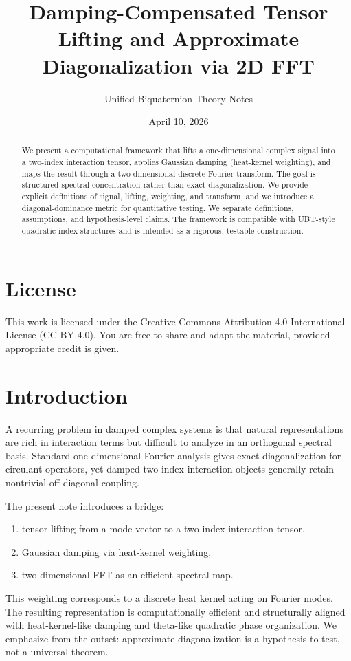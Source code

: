 \documentclass[11pt]{article}
\title{Damping-Compensated Tensor Lifting and Approximate Diagonalization via 2D FFT}
\author{Unified Biquaternion Theory Notes}
\date{April 10, 2026}
\begin{document}
\maketitle

\begin{abstract}
We present a computational framework that lifts a one-dimensional complex signal into a two-index interaction tensor, applies Gaussian damping (heat-kernel weighting), and maps the result through a two-dimensional discrete Fourier transform. The goal is structured spectral concentration rather than exact diagonalization. We provide explicit definitions of signal, lifting, weighting, and transform, and we introduce a diagonal-dominance metric for quantitative testing. We separate definitions, assumptions, and hypothesis-level claims. The framework is compatible with UBT-style quadratic-index structures and is intended as a rigorous, testable construction.
\end{abstract}

\section*{License}
This work is licensed under the Creative Commons Attribution 4.0 International License (CC BY 4.0).
You are free to share and adapt the material, provided appropriate credit is given.

\section{Introduction}
A recurring problem in damped complex systems is that natural representations are rich in interaction terms but difficult to analyze in an orthogonal spectral basis. Standard one-dimensional Fourier analysis gives exact diagonalization for circulant operators, yet damped two-index interaction objects generally retain nontrivial off-diagonal coupling.

The present note introduces a bridge:
\begin{enumerate}
    \item tensor lifting from a mode vector to a two-index interaction tensor,
    \item Gaussian damping via heat-kernel weighting,
    \item two-dimensional FFT as an efficient spectral map.
\end{enumerate}
This weighting corresponds to a discrete heat kernel acting on Fourier modes.
The resulting representation is computationally efficient and structurally aligned with heat-kernel-like damping and theta-like quadratic phase organization. We emphasize from the outset: approximate diagonalization is a hypothesis to test, not a universal theorem.
\end{document}
